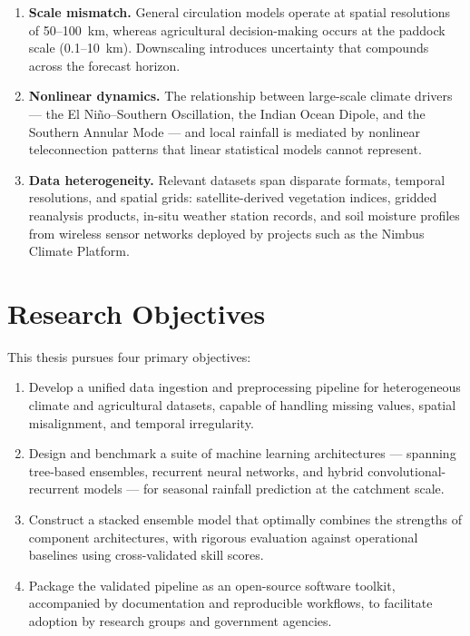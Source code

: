 \documentclass[12pt,a4paper]{report}
\begin{document}
\begin{enumerate}[label=(\arabic*),leftmargin=*]
  \item \textbf{Scale mismatch.} General circulation models operate at spatial
        resolutions of 50--100~km, whereas agricultural decision-making occurs
        at the paddock scale (0.1--10~km). Downscaling introduces uncertainty
        that compounds across the forecast horizon.
  \item \textbf{Nonlinear dynamics.} The relationship between large-scale
        climate drivers --- the El Ni\~{n}o--Southern Oscillation, the Indian
        Ocean Dipole, and the Southern Annular Mode --- and local rainfall is
        mediated by nonlinear teleconnection patterns that linear statistical
        models cannot represent.
  \item \textbf{Data heterogeneity.} Relevant datasets span disparate formats,
        temporal resolutions, and spatial grids: satellite-derived vegetation
        indices, gridded reanalysis products, in-situ weather station records,
        and soil moisture profiles from wireless sensor networks deployed by
        projects such as the Nimbus Climate Platform.
\end{enumerate}

\section{Research Objectives}

This thesis pursues four primary objectives:

\begin{enumerate}[label=RO\arabic*:,leftmargin=*]
  \item Develop a unified data ingestion and preprocessing pipeline for
        heterogeneous climate and agricultural datasets, capable of handling
        missing values, spatial misalignment, and temporal irregularity.
  \item Design and benchmark a suite of machine learning architectures ---
        spanning tree-based ensembles, recurrent neural networks, and hybrid
        convolutional-recurrent models --- for seasonal rainfall prediction
        at the catchment scale.
  \item Construct a stacked ensemble model that optimally combines the
        strengths of component architectures, with rigorous evaluation against
        operational baselines using cross-validated skill scores.
  \item Package the validated pipeline as an open-source software toolkit,
        accompanied by documentation and reproducible workflows, to facilitate
        adoption by research groups and government agencies.
\end{enumerate}
\end{document}
